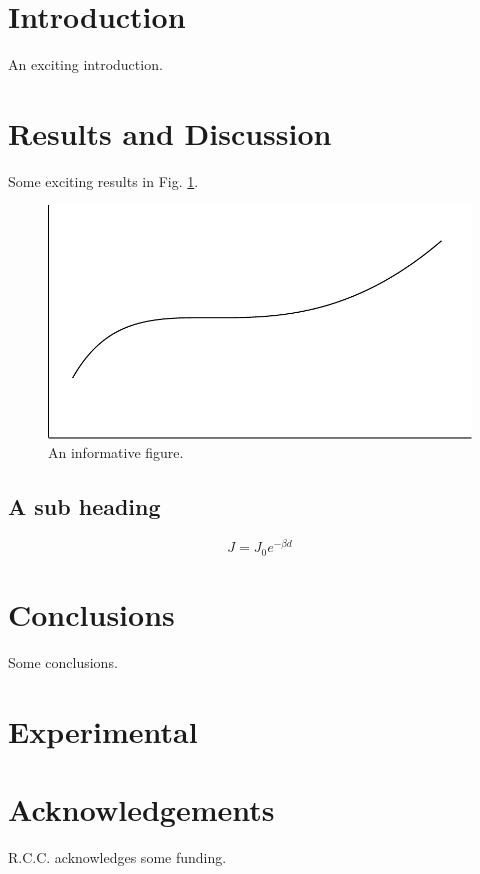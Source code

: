 \documentclass{rcclab}
\begin{document}
\section{Introduction}

An exciting introduction.\autocite{Chiechi2008}





\section{Results and Discussion}

Some exciting results in Fig. \ref{fig:usefulplot}.


\begin{figure}
    \centering
    \includegraphics[width=0.7\linewidth]{Figure1}
    \caption{An informative figure.}
    \label{fig:usefulplot}
\end{figure}

\subsection{A sub heading}


\begin{equation}
    \label{eq:beta}
    J = J_0 e^{-\beta d}
\end{equation}



\section{Conclusions}

Some conclusions.

\section{Experimental}


\section{Acknowledgements}

R.C.C. acknowledges some funding.

\clearpage
\printbibliography
\end{document}
